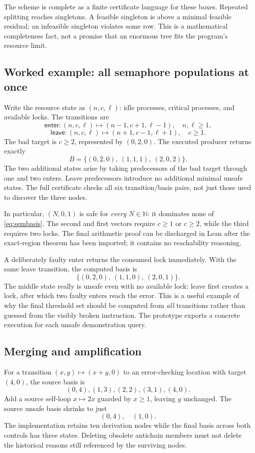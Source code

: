 \documentclass[11pt,a4paper]{article}
\theoremstyle{definition}
\newcommand{\N}{\mathbb N}
\begin{document}
The scheme is complete as a finite certificate language for these boxes.
Repeated splitting reaches singletons. A feasible singleton is above a minimal
feasible residual; an infeasible singleton violates some row. This is a
mathematical completeness fact, not a promise that an enormous tree fits the
program's resource limit.

\subsection{Worked example: all semaphore populations at once}
Write the resource state as $(n,c,\ell)$: idle processes, critical processes,
and available locks. The transitions are
\[
 \mathsf{enter}: (n,c,\ell)\mapsto(n-1,c+1,\ell-1),\quad n,\ell\geq1,
\]
\[
 \mathsf{leave}: (n,c,\ell)\mapsto(n+1,c-1,\ell+1),\quad c\geq1.
\]
The bad target is $c\geq2$, represented by $(0,2,0)$. The executed producer
returns exactly
\begin{equation}
 B=\{(0,2,0),\ (1,1,1),\ (2,0,2)\}.
 \label{eq:sembasis}
\end{equation}
The two additional states arise by taking predecessors of the bad target
through one and two enters. Leave predecessors introduce no additional
minimal unsafe states. The full certificate checks all six
transition/basis pairs, not just those used to discover the three nodes.

In particular, $(N,0,1)$ is safe for \emph{every} $N\in\N$: it dominates none
of \eqref{eq:sembasis}. The second and first vectors require $c\geq1$ or
$c\geq2$, while the third requires two locks. The final arithmetic proof can
be discharged in Lean after the exact-region theorem has been imported; it
contains no reachability reasoning.

A deliberately faulty enter returns the consumed lock immediately. With the
same leave transition, the computed basis is
\[
 \{(0,2,0),\ (1,1,0),\ (2,0,1)\}.
\]
The middle state really is unsafe even with no available lock: leave first
creates a lock, after which two faulty enters reach the error. This is a useful
example of why the final threshold set should be computed from \emph{all}
transitions rather than guessed from the visibly broken instruction. The
prototype exports a concrete execution for each unsafe demonstration query.

\subsection{Merging and amplification}
For a transition $(x,y)\mapsto(x+y,0)$ to an error-checking location with
target $(4,0)$, the source basis is
\[
 (0,4),(1,3),(2,2),(3,1),(4,0).
\]
Add a source self-loop $x\mapsto2x$ guarded by $x\geq1$, leaving $y$
unchanged. The source unsafe basis shrinks to just
\[
 (0,4),\quad(1,0).
\]
The implementation retains ten derivation nodes while the final basis across
both controls has three states. Deleting obsolete antichain members must not
delete the historical reasons still referenced by the surviving nodes.
\end{document}
